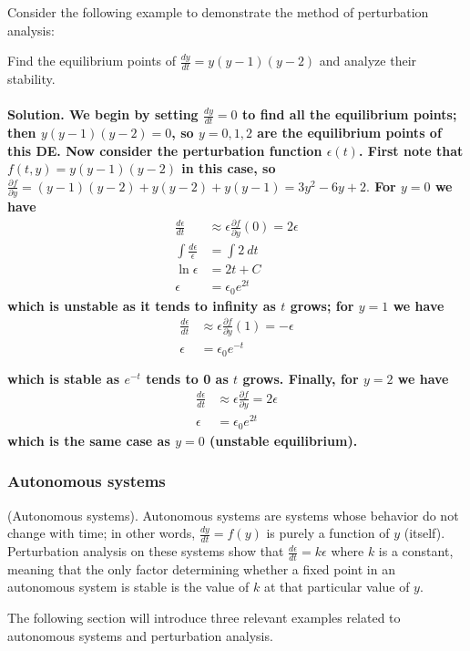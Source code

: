 \documentclass{article}
\begin{document}
Consider the following example to demonstrate the method of perturbation analysis:
\begin{example}
Find the equilibrium points of $\frac{dy}{dt} =y(y-1)(y-2)$ and analyze their stability. \\ \\
\bf Solution. \normalfont We begin by setting $\frac{dy}{dt} = 0$ to find all the equilibrium points; then $y(y-1)(y-2)=0$, so $y = 0, 1, 2$ are the equilibrium points of this DE. 
Now consider the perturbation function $\epsilon(t)$. First note that $f(t,y) = y(y-1)(y-2)$ in this case, so $\frac{\partial f}{\partial y} = (y-1)(y-2) + y(y-2) + y(y-1) = 3y^2 - 6y + 2.$ For $y = 0$ we have
\begin{equation*}
    \begin{aligned}
        \frac{d\epsilon}{dt} &\approx \epsilon \frac{\partial f}{\partial y}(0) = 2\epsilon \\
        \int \frac{d\epsilon}{\epsilon} &= \int 2\ dt \\
        \ln \epsilon &= 2t + C \\
        \epsilon &= \epsilon_0 e^{2t}
    \end{aligned}
\end{equation*}
which is unstable as it tends to infinity as $t$ grows; for $y = 1$ we have
\begin{equation*}
    \begin{aligned}
        \frac{d\epsilon}{dt} &\approx \epsilon \frac{\partial f}{\partial y}(1) = -\epsilon \\
        \epsilon &= \epsilon_0 e^{-t} \\ \\
    \end{aligned}
\end{equation*}
which is stable as $e^{-t}$ tends to 0 as $t$ grows. Finally, for $y=2$ we have
\begin{equation*}
    \begin{aligned}
        \frac{d\epsilon}{dt} &\approx \epsilon \frac{\partial f}{\partial y} = 2\epsilon \\
        \epsilon &= \epsilon_0 e^{2t}
    \end{aligned}
\end{equation*}
which is the same case as $y=0$ (unstable equilibrium).
\end{example}
\subsubsection{Autonomous systems}
\begin{definition}
(Autonomous systems). Autonomous systems are systems whose behavior do not change with time; in other words, $\frac{dy}{dt} = f(y)$ is purely a function of $y$ (itself). 
Perturbation analysis on these systems show that $\frac{d \epsilon}{dt} = k\epsilon$ where $k$ is a constant, meaning that the only factor determining whether a fixed point in an autonomous system is stable is the value of $k$ at that particular value of $y$. 
\end{definition}
The following section will introduce three relevant examples related to autonomous systems and perturbation analysis.
\end{document}
